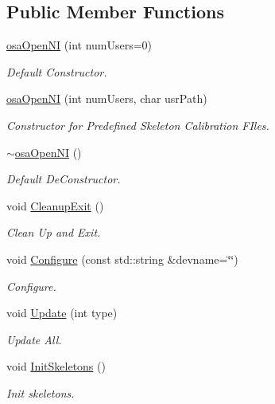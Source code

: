 \subsection*{Public Member Functions}
\begin{DoxyCompactItemize}
\item 
\hyperlink{classosa_open_n_i_aa84fdbe2c499a1a00ae275052f8bd9f7}{osa\+Open\+N\+I} (int num\+Users=0)
\begin{DoxyCompactList}\small\item\em Default Constructor. \end{DoxyCompactList}\item 
\hyperlink{classosa_open_n_i_a3194471e7876fa2e9d47d646e9a6a596}{osa\+Open\+N\+I} (int num\+Users, char usr\+Path)
\begin{DoxyCompactList}\small\item\em Constructor for Predefined Skeleton Calibration F\+Iles. \end{DoxyCompactList}\item 
\hyperlink{classosa_open_n_i_ab8cea3bc689522cff98db4e6c0f780a8}{$\sim$osa\+Open\+N\+I} ()
\begin{DoxyCompactList}\small\item\em Default De\+Constructor. \end{DoxyCompactList}\item 
void \hyperlink{classosa_open_n_i_a2bf147bee34f5712746526b01a6cae6f}{Cleanup\+Exit} ()
\begin{DoxyCompactList}\small\item\em Clean Up and Exit. \end{DoxyCompactList}\item 
void \hyperlink{classosa_open_n_i_a7b9ebb7dd8d0589898516cc000b20a1a}{Configure} (const std\+::string \&devname=\char`\"{}\char`\"{})
\begin{DoxyCompactList}\small\item\em Configure. \end{DoxyCompactList}\item 
void \hyperlink{classosa_open_n_i_adfdd55a8a6c0057a1e10d7878ed5a17d}{Update} (int type)
\begin{DoxyCompactList}\small\item\em Update All. \end{DoxyCompactList}\item 
void \hyperlink{classosa_open_n_i_a976b65514f34dc257445a6358b03ac37}{Init\+Skeletons} ()
\begin{DoxyCompactList}\small\item\em Init skeletons. \end{DoxyCompactList}\item 

\end{DoxyCompactItemize}
